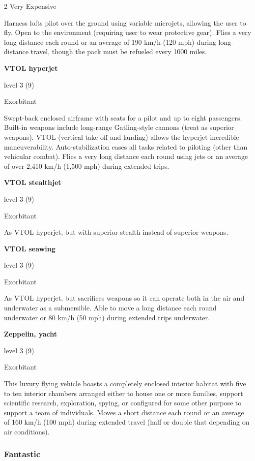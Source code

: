 \begin{multicols}{2}
Very Expensive 

Harness lofts pilot over the ground using variable microjets, allowing the user to fly. Open to the environment (requiring user to wear protective gear). Flies a very long distance each round or an average of 190 km/h (120 mph) during long-distance travel, though the pack must be refueled every 1000 miles. 

\textbf{VTOL hyperjet} 

level 3 (9) 

Exorbitant 

Swept-back enclosed airframe with seats for a pilot and up to eight passengers. Built-in weapons include long-range Gatling-style cannons (treat as superior weapons). VTOL (vertical take-off and landing) allows the hyperjet incredible maneuverability. Auto-stabilization eases all tasks related to piloting (other than vehicular combat). Flies a very long distance each round using jets or an average of over 2,410 km/h (1,500 mph) during extended trips.

\textbf{VTOL stealthjet} 

level 3 (9) 

Exorbitant

As VTOL hyperjet, but with superior stealth instead of superior weapons. 

\textbf{VTOL seawing} 

level 3 (9) 

Exorbitant 

As VTOL hyperjet, but sacrifices weapons so it can operate both in the air and underwater as a submersible. Able to move a long distance each round underwater or 80 km/h (50 mph) during extended trips underwater. 

\textbf{Zeppelin, yacht} 

level 3 (9) 

Exorbitant 

This luxury flying vehicle boasts a completely enclosed interior habitat with five to ten interior chambers arranged either to house one or more families, support scientific research, exploration, spying, or configured for some other purpose to support a team of individuals. Moves a short distance each round or an average of 160 km/h (100 mph) during extended travel (half or double that depending on air conditions).

\subsubsection{Fantastic}


\end{multicols}
